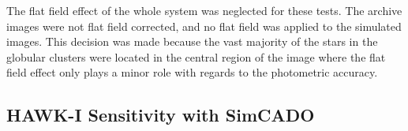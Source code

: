 The flat field effect of the whole system was neglected for these tests. The archive images were not flat field corrected, and no flat field was applied to the simulated images. This decision was made because the vast majority of the stars in the globular clusters were located in the central region of the image where the flat field effect only plays a minor role with regards to the photometric accuracy.



\subsection{HAWK-I Sensitivity with SimCADO}


